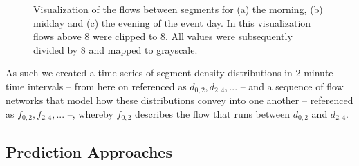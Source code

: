 \documentclass[12pt,a4paper,twoside,openright]{book}
\begin{document}
\begin{figure}
	\caption[Visualization of the flows between segments]{Visualization of the flows between segments for (a) the morning, (b) midday and (c) the evening of the event day. In this visualization flows above 8 were clipped to 8. All values were subsequently divided by 8 and mapped to grayscale.}
	\label{fig:flows}
\end{figure}

As such we created a time series of segment density distributions in 2 minute time intervals -- from here on referenced as $d_{0,2}, d_{2,4}, ...$ -- and a sequence of flow networks that model how these distributions convey into one another -- referenced as $f_{0,2}, f_{2,4}, ...$ --, whereby $f_{0,2}$ describes the flow that runs between $d_{0,2}$ and $d_{2,4}$.

\subsection{Prediction Approaches}
\label{subsec:predicting-human-crowd-densities}
\end{document}
